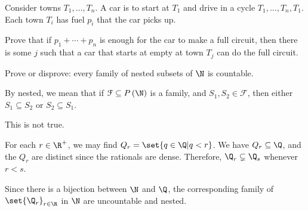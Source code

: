 \documentclass[10pt]{mypackage}
\begin{document}
\begin{problem}
  Consider towns $T_1,\dots,T_n$. A car is to start at $T_1$ and drive in a cycle $T_1,\dots,T_n,T_1$. Each town $T_i$ has fuel $p_i$ that the car picks up.\newline

  Prove that if $p_1+\cdots+p_n$ is enough for the car to make a full circuit, then there is some $j$ such that a car that starts at empty at town $T_j$ can do the full circuit.
\end{problem}
\begin{problem}
  Prove or disprove: every family of nested subsets of $\N$ is countable.
\end{problem}
\begin{solution}
  By nested, we mean that if $\mathcal{F}\subseteq P\left( \N \right)$ is a family, and $S_1,S_2\in \mathcal{F}$, then either $S_1\subseteq S_2$ or $S_2\subseteq S_1$.\newline

  This is not true.\newline

  For each $r\in \R^{+}$, we may find $Q_r = \set{q \in \Q | q < r}$. We have $Q_r\subseteq \Q$, and the $Q_r$ are distinct since the rationals are dense. Therefore, $\Q_r\subsetneq \Q_s$ whenever $r < s$.\newline

  Since there is a bijection between $\N$ and $\Q$, the corresponding family of $\set{\Q_r}_{r\in\R}$ in $\N$ are uncountable and nested.
\end{solution}
\end{document}
